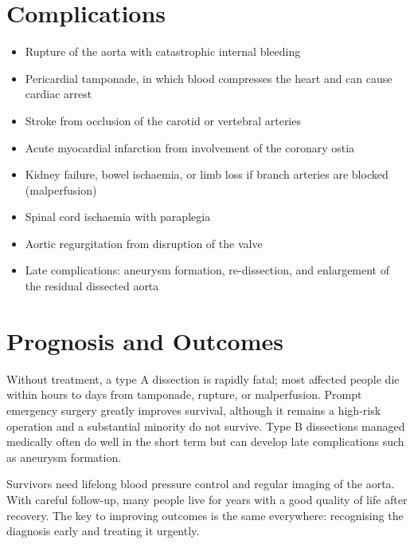 \section*{Complications}
\begin{itemize}
    \item Rupture of the aorta with catastrophic internal bleeding
    \item Pericardial tamponade, in which blood compresses the heart and can cause cardiac arrest
    \item Stroke from occlusion of the carotid or vertebral arteries
    \item Acute myocardial infarction from involvement of the coronary ostia
    \item Kidney failure, bowel ischaemia, or limb loss if branch arteries are blocked (malperfusion)
    \item Spinal cord ischaemia with paraplegia
    \item Aortic regurgitation from disruption of the valve
    \item Late complications: aneurysm formation, re-dissection, and enlargement of the residual dissected aorta
\end{itemize}

\section*{Prognosis and Outcomes}
Without treatment, a type A dissection is rapidly fatal; most affected people die within hours to days from tamponade, rupture, or malperfusion. Prompt emergency surgery greatly improves survival, although it remains a high-risk operation and a substantial minority do not survive. Type B dissections managed medically often do well in the short term but can develop late complications such as aneurysm formation.

Survivors need lifelong blood pressure control and regular imaging of the aorta. With careful follow-up, many people live for years with a good quality of life after recovery. The key to improving outcomes is the same everywhere: recognising the diagnosis early and treating it urgently.

